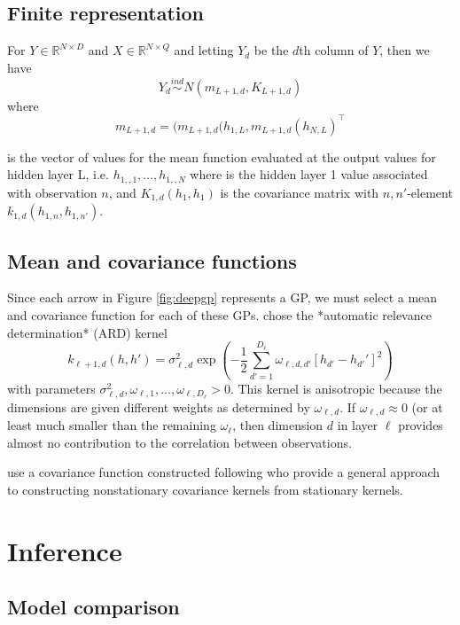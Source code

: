 \documentclass{article}
\newcommand{\ind}{\stackrel{ind}{\sim}}
\newcommand{\1}{\mathbbm{1}}
\begin{document}
\subsection{Finite representation}

For $Y \in \mathbb{R}^{N \times D}$ and $X\in \mathbb{R}^{N\times Q}$
and letting $Y_d$ be the $d$th column of $Y$,
then we have 
\[
Y_d \ind N(m_{L+1,d}, K_{L+1,d})
\]
where 
\[
m_{L+1,d} = (m_{L+1,d}(h_{1,L},m_{L+1,d}(h_{N,L})^\top
\]

is the vector of values for the mean function evaluated at the output values for 
hidden layer L, i.e. $h_{1,,1},\ldots,h_{1,,N}$ where 
is the hidden layer 1 value associated with observation $n$, and 
$K_{1,d}(h_1,h_1)$ is the covariance matrix with $n,n'$-element
$k_{1,d}(h_{1,n},h_{1,n'})$.


\subsection{Mean and covariance functions}

Since each arrow in Figure \ref{fig:deepgp} represents a GP, 
we must select a mean and covariance function for each of these GPs. 
\cite{damianou2013deep} chose the *automatic relevance determination* (ARD) 
kernel
\[
k_{\ell+1,d}(h,h') = 
\sigma^2_{\ell,d} \exp\left(-\frac{1}{2} \sum_{d'=1}^{D_\ell} \omega_{\ell,d,d'} \left[ h_{d'} - h_{d'}' \right]^2\right)
\]
with parameters $\sigma^2_{\ell,d},\omega_{\ell,1},\ldots,\omega_{\ell,D_\ell} > 0$.
This kernel is anisotropic because the dimensions are given different weights
as determined by $\omega_{\ell,d}$.
If $\omega_{\ell,d} \approx 0$ (or at least much smaller than the remaining $\omega_{\ell}$, 
then dimension $d$ in layer $\ell$ provides almost no contribution to the correlation between
observations.

\cite{dunlop2018deep} use a covariance function constructed following 
\cite{paciorek2004nonstationary} who provide a general approach to constructing
nonstationary covariance kernels from stationary kernels.




\section{Inference}

\subsection{Model comparison}
\end{document}
